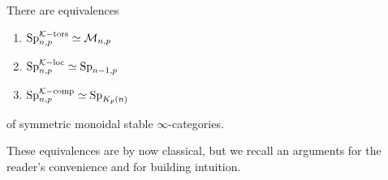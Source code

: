\begin{proposition}
    \label{ch0:prop:torsion-is-monochromatic}
    There are equivalences
    \begin{enumerate}
        \item $\mathrm{Sp}_{n,p}^{\mathcal{K}-\mathrm{tors}}\simeq \mathcal{M}_{n,p}$
        \item $\mathrm{Sp}_{n,p}^{\mathcal{K}-\mathrm{loc}}\simeq \mathrm{Sp}_{n-1,p}$
        \item $\mathrm{Sp}_{n,p}^{\mathcal{K}-\mathrm{comp}}\simeq \mathrm{Sp}_{{K_p(n)}}$
    \end{enumerate} 
    of symmetric monoidal stable $\infty$-categories. 
\end{proposition}

\begin{remark}
    These equivalences are by now classical, but we recall an arguments for the reader's convenience and for building intuition. 
\end{remark}

